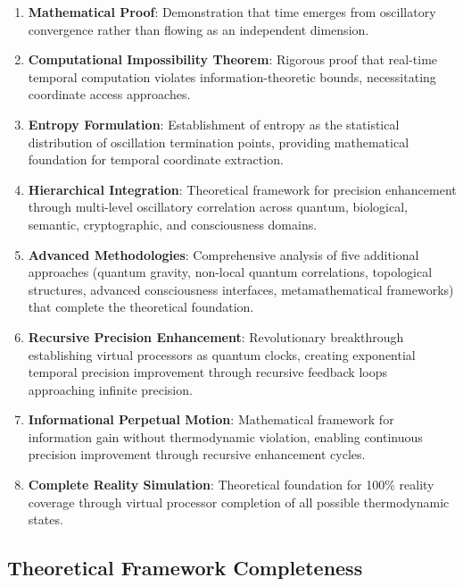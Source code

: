 \documentclass[11pt]{article}
\theoremstyle{remark}
\begin{document}
\begin{enumerate}
\item \textbf{Mathematical Proof}: Demonstration that time emerges from oscillatory convergence rather than flowing as an independent dimension.

\item \textbf{Computational Impossibility Theorem}: Rigorous proof that real-time temporal computation violates information-theoretic bounds, necessitating coordinate access approaches.

\item \textbf{Entropy Formulation}: Establishment of entropy as the statistical distribution of oscillation termination points, providing mathematical foundation for temporal coordinate extraction.

\item \textbf{Hierarchical Integration}: Theoretical framework for precision enhancement through multi-level oscillatory correlation across quantum, biological, semantic, cryptographic, and consciousness domains.

\item \textbf{Advanced Methodologies}: Comprehensive analysis of five additional approaches (quantum gravity, non-local quantum correlations, topological structures, advanced consciousness interfaces, metamathematical frameworks) that complete the theoretical foundation.

\item \textbf{Recursive Precision Enhancement}: Revolutionary breakthrough establishing virtual processors as quantum clocks, creating exponential temporal precision improvement through recursive feedback loops approaching infinite precision.

\item \textbf{Informational Perpetual Motion}: Mathematical framework for information gain without thermodynamic violation, enabling continuous precision improvement through recursive enhancement cycles.

\item \textbf{Complete Reality Simulation}: Theoretical foundation for 100\% reality coverage through virtual processor completion of all possible thermodynamic states.
\end{enumerate}

\subsection{Theoretical Framework Completeness}
\end{document}
